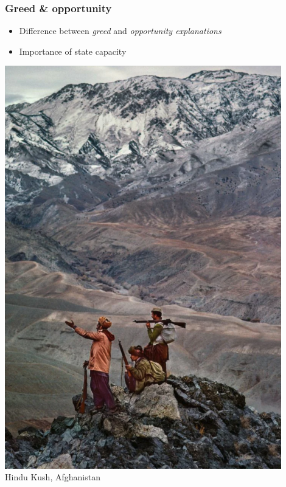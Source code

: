 \documentclass[aspectratio=43]{beamer}
\begin{document}
\begin{frame}
\frametitle{Greed \& opportunity}
\centering

\begin{minipage}{0.48\textwidth}\centering
\begin{itemize}
  \item Difference between \textit{greed} and \textit{opportunity explanations}
  \item Importance of state capacity
\end{itemize}
\end{minipage}\hfill
\begin{minipage}{0.48\textwidth}\centering
\includegraphics[width = 0.9\textwidth]{img/hindukush}\\{\footnotesize Hindu Kush, Afghanistan}
\end{minipage}
  



\end{frame}
\end{document}
